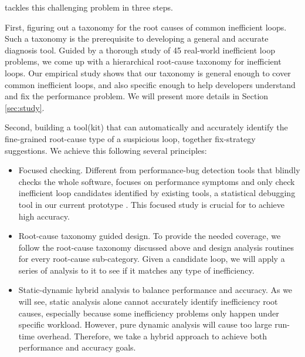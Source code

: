 \Tool tackles this challenging problem in three steps.

First, figuring out a taxonomy for the root causes of common inefficient loops.
Such a taxonomy is the prerequisite to developing a general and accurate
diagnosis tool. Guided by a thorough study of 45 real-world inefficient
loop problems, we come up with a hierarchical root-cause taxonomy for
inefficient loops. 
Our empirical study shows that our taxonomy is general enough to cover
common inefficient loops, and also specific enough to help developers understand
and fix the performance problem. We will present more details 
in Section \ref{sec:study}.
 
Second, building a tool(kit) \Tool that can automatically and accurately
identify the fine-grained root-cause type of a suspicious loop, 
together fix-strategy suggestions. 
We achieve this following several principles:

\begin{itemize}
\item Focused checking. 
Different from performance-bug detection tools that blindly checks the whole
software, \Tool focuses on performance symptoms and only check inefficient
loop candidates identified by existing tools, a statistical debugging
tool in our current prototype \cite{SongOOPSLA2014}. 
This focused study is crucial for \Tool to achieve high
accuracy.

\item Root-cause taxonomy guided design. To provide the needed coverage, we follow
the root-cause taxonomy discussed above and design analysis routines for 
every root-cause sub-category. Given a candidate loop, we will 
apply a series of analysis to it to see if it matches any type of inefficiency.

\item Static-dynamic hybrid analysis to balance performance and accuracy.
As we will see, static analysis alone cannot accurately identify 
inefficiency root causes, especially because some inefficiency problems only
happen under specific workload. However, pure dynamic analysis will 
cause too large 
run-time overhead. Therefore, we take a hybrid approach to achieve both
performance and accuracy goals.
\end{itemize}

